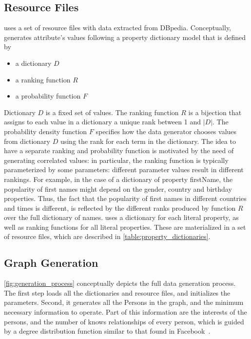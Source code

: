 \subsection{Resource Files}

\datagen uses a set of resource files with data
extracted from DBpedia. Conceptually, \datagen generates attribute's
values following a property dictionary model that is defined by

\begin{itemize}
    \item a dictionary $D$
    \item a ranking function $R$
    \item a probability function $F$
\end{itemize}

Dictionary $D$ is a fixed set of values. The ranking function $R$ is a bijection
that assigns to each value in a dictionary a unique rank between 1 and $|D|$.
The probability density function $F$ specifies how the data generator chooses
values from dictionary $D$ using the rank for each term in the dictionary. The
idea to have a separate ranking and probability function is motivated by the
need of generating correlated values: in particular, the ranking function is
typically parameterized by some parameters: different parameter values result
in different rankings. For example, in the case of a dictionary of property
firstName, the popularity of first names might depend on the gender, country
and birthday properties. Thus, the fact that the popularity of first names in
different countries and times is different, is reflected by the different ranks
produced by function $R$ over the full dictionary of names.  \datagen uses a
dictionary for each literal property, as well as ranking functions for all
literal properties. These are materialized in a set of resource files, which
are described in \autoref{table:property_dictionaries}.



\subsection{Graph Generation}

\autoref{fig:generation_process} conceptually depicts the full data
generation process. The first step loads all the dictionaries and resource
files, and initializes the \datagen parameters.  Second, it generates all the
Persons in the graph, and the minimum necessary information to operate. Part of
this information are the interests of the persons, and the number of knows
relationships of every person, which is guided by a degree distribution
function similar to that found in Facebook~\cite{facebook_anatomy}.

